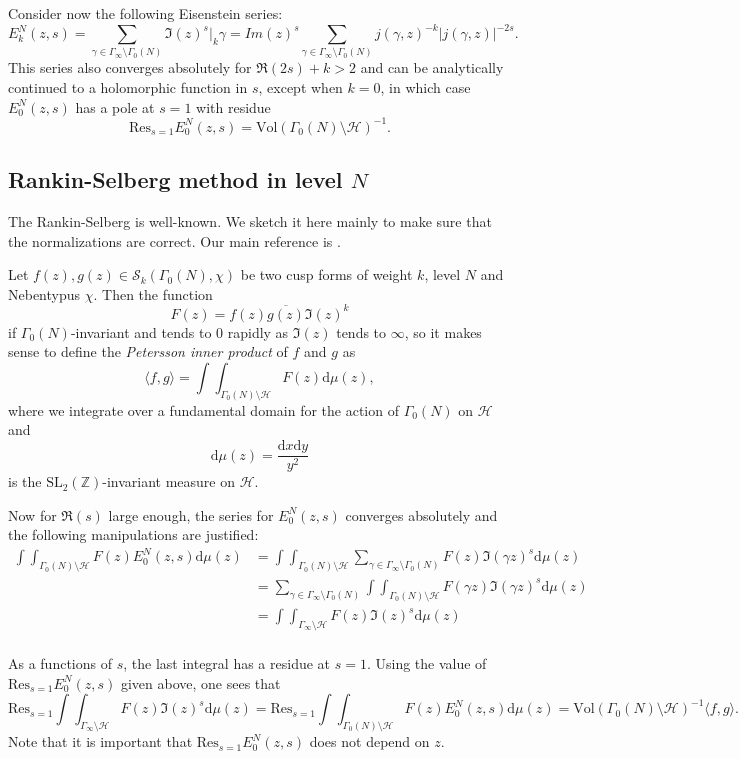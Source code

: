\documentclass[twoside,10pt]{article}
\newcommand{\Res}{\textrm{Res}}
\newcommand{\dashk}{\vert_{k}}
\renewcommand{\H}{\mathcal{H}}
\renewcommand{\S}{\mathcal{S}}
\newcommand{\SL}{\textrm{SL}_2(\mathbb{Z})}
\renewcommand{\d}{\text{d}}
\begin{document}
Consider now the following Eisenstein series:
\[E_k^N(z,s)=\sum_{\gamma\in\Gamma_\infty\setminus\Gamma_0(N)}\Im(z)^s\dashk\gamma=Im(z)^s\sum_{\gamma\in\Gamma_\infty\setminus\Gamma_0(N)}j(\gamma,z)^{-k}|j(\gamma,z)|^{-2s}.\]
This series also converges absolutely for $\Re(2s)+k>2$ and can be analytically continued to a holomorphic function in $s$, except when $k=0$, in which case $E_0^N(z,s)$ has a pole at $s=1$ with residue
\[\Res_{s=1}E_0^N(z,s)=\text{Vol}(\Gamma_0(N)\setminus\H)^{-1}.\]


\subsection{Rankin-Selberg method in level $N$}
The Rankin-Selberg is well-known. We sketch it here mainly to make sure that the normalizations are correct. Our main reference is \cite{Shi2}.

Let $f(z),g(z)\in\S_k(\Gamma_0(N),\chi)$ be two cusp forms of weight $k$, level $N$ and Nebentypus $\chi$. Then the function
\[F(z)=f(z)\overline{g(z)}\Im(z)^k\]
if $\Gamma_0(N)$-invariant and tends to $0$ rapidly as $\Im(z)$ tends to $\infty$, so it makes sense to define the \emph{Petersson inner product} of $f$ and $g$ as
\[\langle f,g\rangle=\int\int_{\Gamma_0(N)\setminus\H}F(z)\d\mu(z),\]
where we integrate over a fundamental domain for the action of $\Gamma_0(N)$ on $\H$ and
\[\d\mu(z)=\frac{\d x\d y}{y^2}\]
is the $\SL$-invariant measure on $\H$.

Now for $\Re(s)$ large enough, the series for $E_0^N(z,s)$ converges absolutely and the following manipulations are justified:
\begin{align*}
\int\int_{\Gamma_0(N)\setminus\H}F(z)E_0^N(z,s)\d\mu(z) &=\int\int_{\Gamma_0(N)\setminus\H}\sum_{\gamma\in\Gamma_\infty\setminus\Gamma_0(N)}F(z)\Im(\gamma z)^s\d\mu(z)\\
														&=\sum_{\gamma\in\Gamma_\infty\setminus\Gamma_0(N)}\int\int_{\Gamma_0(N)\setminus\H}F(\gamma z)\Im(\gamma z)^s\d\mu(z)\\
														&=\int\int_{\Gamma_\infty\setminus\H}F(z)\Im(z)^s\d\mu(z)\\
\end{align*}

As a functions of $s$, the last integral has a residue at $s=1$. Using the value of $\Res_{s=1}E^N_0(z,s)$ given above, one sees that
\[\Res_{s=1}\int\int_{\Gamma_\infty\setminus\H}F(z)\Im(z)^s\d\mu(z)=\Res_{s=1}\int\int_{\Gamma_0(N)\setminus\H}F(z)E_0^N(z,s)\d\mu(z)=\text{Vol}(\Gamma_0(N)\setminus\H)^{-1}\langle f,g\rangle.\]
Note that it is important that $\Res_{s=1}E^N_0(z,s)$ does not depend on $z$.
\end{document}
